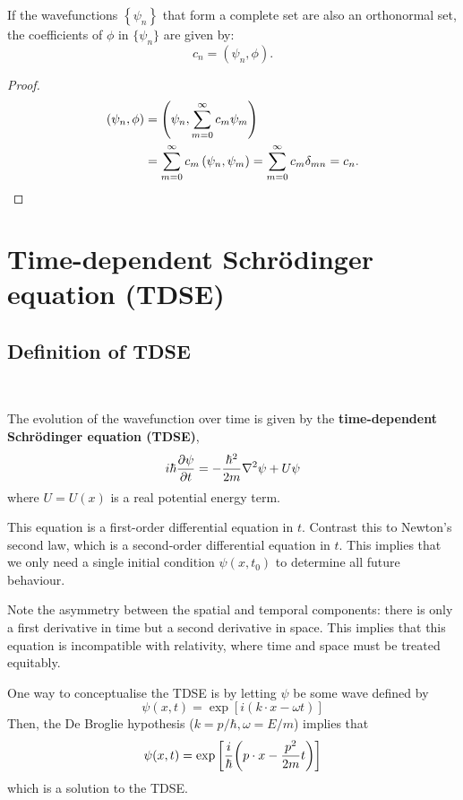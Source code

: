 \documentclass[a4paper]{article}
\begin{document}
\begin{lemma}
    If the wavefunctions $\left\{\psi_n\right\}$ that form a complete set are also an orthonormal set, the coefficients of $ \phi $ in $ \{\psi_n\} $ are given by:
    \[
    c_n=\left(\psi_n, \phi\right).
    \]
\end{lemma}
\begin{proof}
    \begin{align*}
        \left(\psi_n, \phi\right) &=\left(\psi_n, \sum_{m=0}^{\infty} c_m \psi_m\right) \\
        &=\sum_{m=0}^{\infty} c_m\left(\psi_n, \psi_m\right)=\sum_{m=0}^{\infty} c_m \delta_{m n}=c_n.\qedhere
    \end{align*}
\end{proof}

\section{Time-dependent Schr\"odinger equation (TDSE)}
\subsection{Definition of TDSE}\
\vspace{-1.5em}
\begin{definition}
	The evolution of the wavefunction over time is given by the \textbf{time-dependent Schr\"odinger equation (TDSE)},
	\[
		i\hbar \pdv{\psi}{t} = -\frac{\hbar^2}{2m} \laplacian \psi + U \psi
	\]
	where \( U = U(x) \) is a real potential energy term.
\end{definition}

\begin{remark}
	This equation is a first-order differential equation in \( t \).
	Contrast this to Newton's second law, which is a second-order differential equation in \( t \).
	This implies that we only need a single initial condition \( \psi(x,t_0) \) to determine all future behaviour.
\end{remark}
\begin{remark}
	Note the asymmetry between the spatial and temporal components: there is only a first derivative in time but a second derivative in space.
	This implies that this equation is incompatible with relativity, where time and space must be treated equitably.
\end{remark}
One way to conceptualise the TDSE is by letting \( \psi \) be some wave defined by
\[
	\psi(x,t) = \exp[ i(k \cdot x - \omega t) ]
\]
Then, the De Broglie hypothesis (\( k = p/\hbar, \omega = E/m \)) implies that
\[
	\psi(x,t) = \exp\qty[\frac{i}{\hbar}\qty(p \cdot x - \frac{p^2}{2m}t)]
\]
which is a solution to the TDSE.
\end{document}
